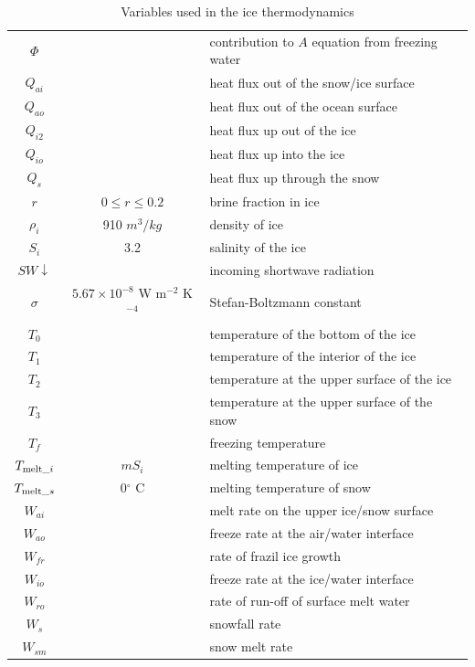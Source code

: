 \begin{table}
{\begin{tabular}{|c|c|l|}
  $\Phi$ && contribution to $A$ equation from freezing water \\
  $Q_{ai}$ && heat flux out of the snow/ice surface \\
  $Q_{ao}$ && heat flux out of the ocean surface \\
  $Q_{i2}$ && heat flux up out of the ice \\
  $Q_{io}$ && heat flux up into the ice \\
  $Q_{s}$  && heat flux up through the snow \\
  $r$   & $0 \le r \le 0.2 $ & brine fraction in ice \\
  $\rho_i$ & 910 $m^3/kg$ & density of ice \\
  $S_i$ & 3.2 & salinity of the ice \\
  $SW\!\!\downarrow$ && incoming shortwave radiation \\
  $\sigma$ & $5.67 \times 10^{-8}$ W m$^{-2}$ K$^{-4}$ &
  Stefan-Boltzmann constant \\
  $T_0$ && temperature of the bottom of the ice \\
  $T_1$ && temperature of the interior of the ice \\
  $T_2$ && temperature at the upper surface of the ice \\
  $T_3$ && temperature at the upper surface of the snow \\
  $T_f$ && freezing temperature \\
  $T_{{\rm melt}\_i}$ & $mS_i$ & melting temperature of ice \\
  $T_{{\rm melt}\_s}$ & 0$^\circ$ C & melting temperature of snow \\
  $W_{ai}$ && melt rate on the upper ice/snow surface \\
  $W_{ao}$ && freeze rate at the air/water interface \\
  $W_{fr}$ && rate of frazil ice growth \\
  $W_{io}$ && freeze rate at the ice/water interface \\
  $W_{ro}$ && rate of run-off of surface melt water \\
  $W_{s}$  && snowfall rate \\
  $W_{sm}$ && snow melt rate \\
  \hline
\end{tabular}
}
\caption{Variables used in the ice thermodynamics}
\label{thermvar}
\end{table}

